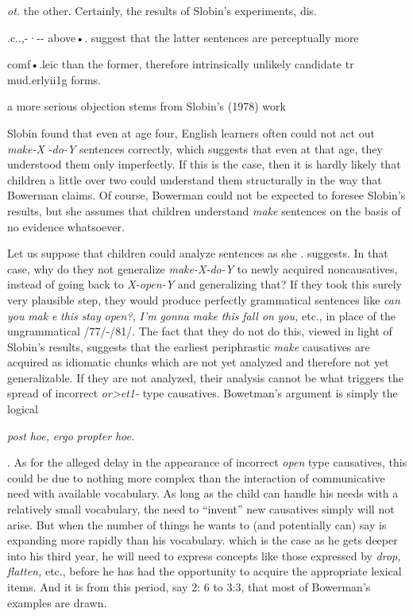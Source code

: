 \textit{ot.} the other. Certainly, the results of Slobin's experiments, dis.

.c..,-·-{}- above•. suggest that the latter sentences are perceptually more

comf•.leic than the former, therefore intrinsically unlikely candidate tr mud.erlyii1g forms.

a more serious objection stems from Slobin's (1978) work


Slobin found that even at age four, English learners often could not act out \textit{make-X} \textit{{}-do-Y} sentences correctly, which suggests that even at that age, they understood them only imperfectly. If this is the case, then it is hardly likely that children a little over two could understand them structurally in the way that Bowerman claims. Of course, Bower\-man could not be expected to foresee Slobin's results, but she assumes that children understand \textit{make} sentences on the basis of no evidence whatsoever.

Let us suppose that children could analyze sentences as she . suggests. In that case, why do they not generalize \textit{make-X-do-Y }to newly acquired noncausatives, instead of going back to \textit{X-open-Y} and generalizing that? If they took this surely very plausible step, they would produce perfectly grammatical sentences like \textit{can you} \textit{mak} \textit{e} \textit{this} \textit{stay} \textit{open?,} \textit{I'm} \textit{gonna} \textit{make} \textit{this} \textit{fall on} \textit{you,} etc., in place of the ungrammatical /77/-/81/. The fact that they do not do this, viewed in light of Slobin's results, suggests that the earliest periphrastic \textit{make }causatives are acquired as idiomatic chunks which are not yet analyzed and therefore not yet generalizable. If they are not analyzed, their analysis cannot be what triggers the spread of incorrect \textit{or{\textgreater}et1-} type causatives. Bowetman's argument is simply the logical

\textit{post} \textit{hoe,} \textit{ergo} \textit{propter} \textit{hoe.}

. As for the alleged delay in the appearance of incorrect \textit{open\-} type causatives, this could be due to nothing more complex than the interaction of communicative need with available vocabulary. As long as the child can handle his needs with a relatively small vocabulary, the need to ``invent'' new causatives simply will not arise. But when the number of things he wants to (and potentially can) say is expanding more rapidly than his vocabulary. which is the case as he gets deeper into his third year, he will need to express concepts like those expressed by \textit{drop,} \textit{flatten,} etc., before he has had the opportunity to acquire the appropriate lexical items. And it is from this period, say 2: 6 to 3:3, that most of Bowerman's examples are drawn.


